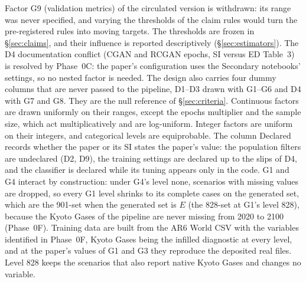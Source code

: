 \documentclass[11pt,a4paper]{article}
\newcommand{\prop}[1]{#1}
\newcommand{\prop}[1]{\textcolor{blue}{#1}}
\begin{document}
\noindent Factor G9 (validation metrics) of the circulated version is
withdrawn: its range was never specified, and varying the thresholds of
the claim rules would turn the pre-registered rules into moving targets.
The thresholds are frozen in \S\ref{sec:claims}, and their influence is
reported descriptively (\S\ref{sec:estimators}). The D4
documentation conflict (CGAN and RCGAN epochs, SI versus ED Table~3) is
resolved by Phase~0C: the paper's configuration uses the Secondary
notebooks' settings, so no nested factor is needed. The design also
carries four dummy columns that are never passed to the pipeline, D1--D3
drawn with G1--G6 and D4 with G7 and G8. They are the null reference of
\S\ref{sec:criteria}. Continuous factors are drawn uniformly on
their ranges, except the epochs multiplier and the sample size, which act
multiplicatively and are log-uniform. Integer factors are uniform on their
integers, and categorical levels are equiprobable. The column Declared
records whether the paper or its SI states the paper's value: the
population filters are undeclared (D2, D9), the training settings are
declared up to the slips of D4, and the classifier is declared while its
tuning appears only in the code. G1 and G4 interact by construction: under
G4's level none, scenarios with missing values are dropped, so every G1
level shrinks to its complete cases on the generated set, which are the
\prop{901-set when the generated set is $E$ (the 828-set at G1's level
828), because the Kyoto Gases of the pipeline are never missing from 2020
to 2100 (Phase~0F). Training data are built from the AR6 World CSV with the
variables identified in Phase~0F, Kyoto Gases being the infilled
diagnostic at every level, and at the paper's values of G1 and G3 they
reproduce the deposited real files. Level 828 keeps the scenarios that also
report native Kyoto Gases and changes no variable.}
\end{document}
